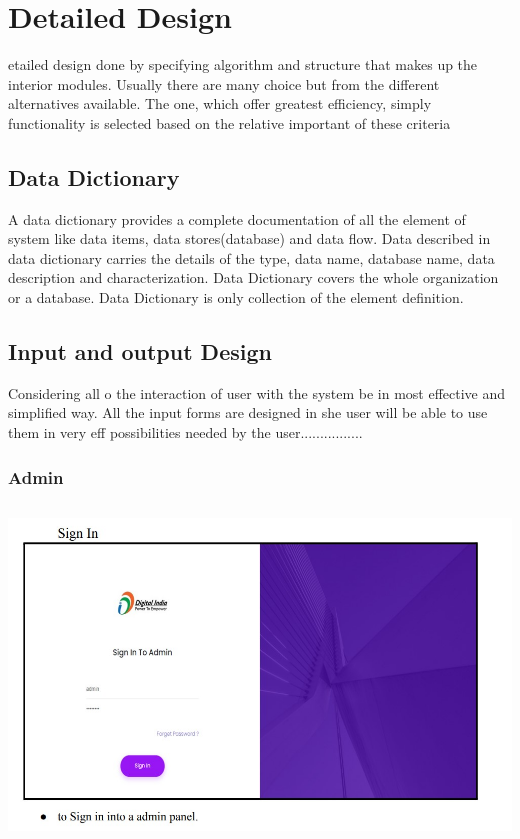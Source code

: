 \chapter{Detailed Design}

etailed design done by specifying algorithm and structure that makes up the interior modules. Usually there are many choice but from the different alternatives available. The one, which offer greatest efficiency, simply functionality is selected based on the relative important of these criteria

\section{Data Dictionary}
A data dictionary provides a complete documentation of all the element of system like data items, data stores(database) and data flow. Data described in data dictionary carries the details of the type, data name, database name, data description and characterization. Data Dictionary covers the whole organization or a database.
Data Dictionary is only collection of the element definition.

\section{Input and output Design}

		Considering all o the interaction of user with the system be in most effective and simplified way.                All the input forms are designed in she user will be able to use them in very eff possibilities needed by the user................
		
		
		
		
		
\subsection{Admin}

\begin{center}
\includegraphics[height=9cm,width=14cm]{Admin/Sign.jpg}
\end{center}


